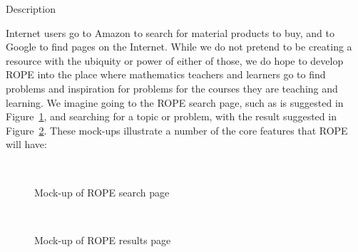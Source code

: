 \documentclass[11pt]{article}
\begin{document}
\begin{section}{Description}

Internet users go to Amazon to search for material products to buy, and to
Google to find pages on the Internet.  While we do not pretend to be
creating a resource with the ubiquity or power of either of those, we do 
hope to develop ROPE into the place where mathematics teachers and
learners go to find problems and inspiration for problems for the courses
they are teaching and learning.  We imagine going to the ROPE search page,
such as is suggested in Figure~\ref{rope1}, and searching for a topic or
problem, with the result suggested in Figure~\ref{rope2}.  These mock-ups
illustrate a number of the core features that ROPE will have:

\begin{figure}
\begin{center}
\\
\caption{Mock-up of ROPE search page}
\label{rope1}
\end{center}
\end{figure}

\begin{figure}
\begin{center}
\\
\caption{Mock-up of ROPE results page}
\label{rope2}
\end{center}
\end{figure}


\end{section}
\end{document}
